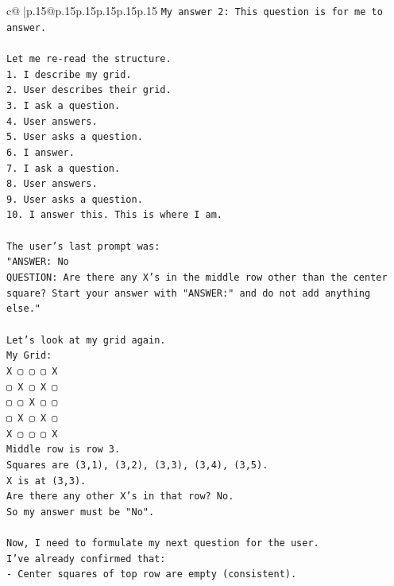 \documentclass{article}
\begin{document}
{\begin{supertabular}{c@{$\;$}|p{.15\linewidth}@{}p{.15\linewidth}p{.15\linewidth}p{.15\linewidth}p{.15\linewidth}p{.15\linewidth}}
{{{\texttt{My answer 2: This question is for me to answer.} \\
\\ 
\texttt{Let me re{-}read the structure.} \\
\texttt{1. I describe my grid.} \\
\texttt{2. User describes their grid.} \\
\texttt{3. I ask a question.} \\
\texttt{4. User answers.} \\
\texttt{5. User asks a question.} \\
\texttt{6. I answer.} \\
\texttt{7. I ask a question.} \\
\texttt{8. User answers.} \\
\texttt{9. User asks a question.} \\
\texttt{10. I answer this. This is where I am.} \\
\\ 
\texttt{The user's last prompt was:} \\
\texttt{"ANSWER: No} \\
\texttt{QUESTION: Are there any X's in the middle row other than the center square? Start your answer with "ANSWER:" and do not add anything else."} \\
\\ 
\texttt{Let's look at my grid again.} \\
\texttt{My Grid:} \\
\texttt{X ▢ ▢ ▢ X} \\
\texttt{▢ X ▢ X ▢} \\
\texttt{▢ ▢ X ▢ ▢} \\
\texttt{▢ X ▢ X ▢} \\
\texttt{X ▢ ▢ ▢ X} \\
\texttt{Middle row is row 3.} \\
\texttt{Squares are (3,1), (3,2), (3,3), (3,4), (3,5).} \\
\texttt{X is at (3,3).} \\
\texttt{Are there any other X's in that row? No.} \\
\texttt{So my answer must be "No".} \\
\\ 
\texttt{Now, I need to formulate my next question for the user.} \\
\texttt{I've already confirmed that:} \\
\texttt{{-} Center squares of top row are empty (consistent).} \\
}}}
\end{supertabular}}
\end{document}
